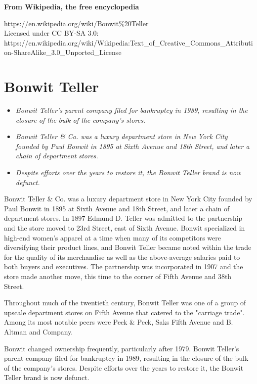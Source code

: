 \textbf{From Wikipedia, the free encyclopedia}

https://en.wikipedia.org/wiki/Bonwit\%20Teller\\
Licensed under CC BY-SA 3.0:\\
https://en.wikipedia.org/wiki/Wikipedia:Text\_of\_Creative\_Commons\_Attribution-ShareAlike\_3.0\_Unported\_License

\section{Bonwit Teller}\label{bonwit-teller}

\begin{itemize}
\item
  \emph{Bonwit Teller's parent company filed for bankruptcy in 1989,
  resulting in the closure of the bulk of the company's stores.}
\item
  \emph{Bonwit Teller \& Co. was a luxury department store in New York
  City founded by Paul Bonwit in 1895 at Sixth Avenue and 18th Street,
  and later a chain of department stores.}
\item
  \emph{Despite efforts over the years to restore it, the Bonwit Teller
  brand is now defunct.}
\end{itemize}

Bonwit Teller \& Co. was a luxury department store in New York City
founded by Paul Bonwit in 1895 at Sixth Avenue and 18th Street, and
later a chain of department stores. In 1897 Edmund D. Teller was
admitted to the partnership and the store moved to 23rd Street, east of
Sixth Avenue. Bonwit specialized in high-end women's apparel at a time
when many of its competitors were diversifying their product lines, and
Bonwit Teller became noted within the trade for the quality of its
merchandise as well as the above-average salaries paid to both buyers
and executives. The partnership was incorporated in 1907 and the store
made another move, this time to the corner of Fifth Avenue and 38th
Street.

Throughout much of the twentieth century, Bonwit Teller was one of a
group of upscale department stores on Fifth Avenue that catered to the
"carriage trade". Among its most notable peers were Peck \& Peck, Saks
Fifth Avenue and B. Altman and Company.

Bonwit changed ownership frequently, particularly after 1979. Bonwit
Teller's parent company filed for bankruptcy in 1989, resulting in the
closure of the bulk of the company's stores. Despite efforts over the
years to restore it, the Bonwit Teller brand is now defunct.

